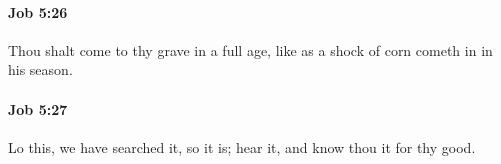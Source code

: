 		\paragraph{Job 5:26} %
			\label{JOB-5-26}

			Thou shalt come to thy grave in a full age, like as a shock of corn cometh in in his season.


		\paragraph{Job 5:27} %
			\label{JOB-5-27}

			Lo this, we have searched it, so it is; hear it, and know thou it for thy good.

